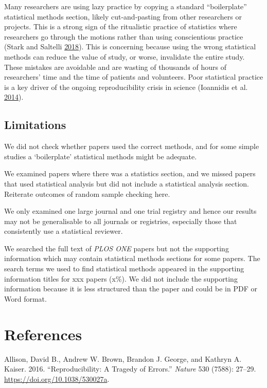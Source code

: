 \documentclass[
]{article}
\begin{document}
Many researchers are using lazy practice by copying a standard ``boilerplate'' statistical methods section, likely cut-and-pasting from other researchers or projects. This is a strong sign of the ritualistic practice of statistics where researchers go through the motions rather than using conscientious practice (Stark and Saltelli \protect\hyperlink{ref-Stark2018}{2018}). This is concerning because using the wrong statistical methods can reduce the value of study, or worse, invalidate the entire study. These mistakes are avoidable and are wasting of thousands of hours of researchers' time and the time of patients and volunteers. Poor statistical practice is a key driver of the ongoing reproducibility crisis in science (Ioannidis et al. \protect\hyperlink{ref-Ioannidis2014}{2014}).

\hypertarget{limitations}{%
\subsection{Limitations}\label{limitations}}

We did not check whether papers used the correct methods, and for some simple studies a `boilerplate' statistical methods might be adequate.

We examined papers where there was a statistics section, and we missed papers that used statistical analysis but did not include a statistical analysis section. Reiterate outcomes of random sample checking here.

We only examined one large journal and one trial registry and hence our results may not be generalisable to all journals or registries, especially those that consistently use a statistical reviewer.

We searched the full text of \emph{PLOS ONE} papers but not the supporting information which may contain statistical methods sections for some papers. The search terms we used to find statistical methods appeared in the supporting information titles for xxx papers (x\%). We did not include the supporting information because it is less structured than the paper and could be in PDF or Word format.

\hypertarget{references}{%
\section*{References}\label{references}}

\hypertarget{refs}{}
\leavevmode\hypertarget{ref-Allison2016}{}%
Allison, David B., Andrew W. Brown, Brandon J. George, and Kathryn A. Kaiser. 2016. ``Reproducibility: A Tragedy of Errors.'' \emph{Nature} 530 (7588): 27--29. \url{https://doi.org/10.1038/530027a}.
\end{document}
